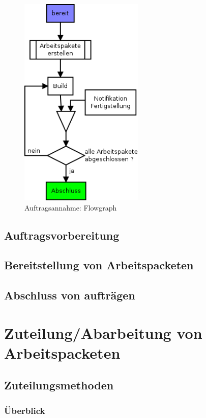 \begin{figure}[ht] 
  \label{fig:lebenszyklus-auftrag-abarbeitung}
  \begin{center}
      \includegraphics[height=4in]{imageinput/lebenszyklus-auftrag-abarbeitung.png}
  \end{center}
  \caption{Auftragsannahme: Flowgraph}
\end{figure}

\subsection{Auftragsvorbereitung}
\subsection{Bereitstellung von Arbeitspacketen}
\subsection{Abschluss von auftr\"agen}


\section{Zuteilung/Abarbeitung von Arbeitspacketen}
\subsection{Zuteilungsmethoden}

\subsubsection{\"Uberblick}

